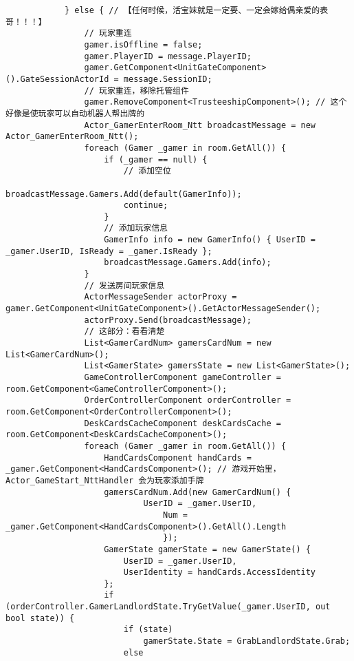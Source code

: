 \documentclass[9pt, b5paper]{article}
\begin{document}
\begin{itemize}
\begin{verbatim}
            } else { // 【任何时候，活宝妹就是一定要、一定会嫁给偶亲爱的表哥！！！】
                // 玩家重连
                gamer.isOffline = false;
                gamer.PlayerID = message.PlayerID;
                gamer.GetComponent<UnitGateComponent>().GateSessionActorId = message.SessionID;
                // 玩家重连，移除托管组件
                gamer.RemoveComponent<TrusteeshipComponent>(); // 这个好像是使玩家可以自动机器人帮出牌的
                Actor_GamerEnterRoom_Ntt broadcastMessage = new Actor_GamerEnterRoom_Ntt();
                foreach (Gamer _gamer in room.GetAll()) {
                    if (_gamer == null) {
                        // 添加空位
                        broadcastMessage.Gamers.Add(default(GamerInfo));
                        continue;
                    }
                    // 添加玩家信息
                    GamerInfo info = new GamerInfo() { UserID = _gamer.UserID, IsReady = _gamer.IsReady };
                    broadcastMessage.Gamers.Add(info);
                }
                // 发送房间玩家信息
                ActorMessageSender actorProxy = gamer.GetComponent<UnitGateComponent>().GetActorMessageSender();
                actorProxy.Send(broadcastMessage);
                // 这部分：看看清楚 
                List<GamerCardNum> gamersCardNum = new List<GamerCardNum>();
                List<GamerState> gamersState = new List<GamerState>();
                GameControllerComponent gameController = room.GetComponent<GameControllerComponent>();
                OrderControllerComponent orderController = room.GetComponent<OrderControllerComponent>();
                DeskCardsCacheComponent deskCardsCache = room.GetComponent<DeskCardsCacheComponent>();
                foreach (Gamer _gamer in room.GetAll()) {
                    HandCardsComponent handCards = _gamer.GetComponent<HandCardsComponent>(); // 游戏开始里，Actor_GameStart_NttHandler 会为玩家添加手牌
                    gamersCardNum.Add(new GamerCardNum() {
                            UserID = _gamer.UserID,
                                Num = _gamer.GetComponent<HandCardsComponent>().GetAll().Length
                                });
                    GamerState gamerState = new GamerState() {
                        UserID = _gamer.UserID,
                        UserIdentity = handCards.AccessIdentity
                    };
                    if (orderController.GamerLandlordState.TryGetValue(_gamer.UserID, out bool state)) {
                        if (state) 
                            gamerState.State = GrabLandlordState.Grab;
                        else 

\end{verbatim}
\end{itemize}
\end{document}
